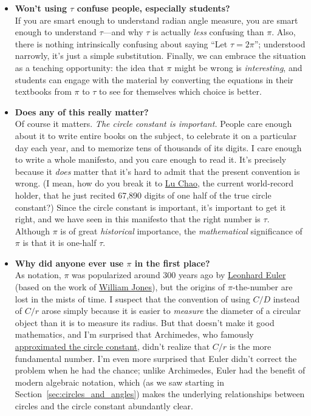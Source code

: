 \begin{itemize}
  \item \textbf{Won't using $\tau$ confuse people, especially students?} \\  If you are smart enough to understand radian angle measure, you are smart enough to understand $\tau$---and  why $\tau$ is actually \emph{less} confusing than $\pi$. Also, there is nothing intrinsically confusing about saying ``Let $\tau = 2\pi$''; understood narrowly, it's just a simple substitution. Finally, we can embrace the situation as a teaching opportunity: the idea that $\pi$ might be wrong is \emph{interesting}, and students can engage with the material by converting the equations in their textbooks from $\pi$ to $\tau$ to see for themselves which choice is better.

  \item \textbf{Does any of this really matter?} \\ Of course it matters. \emph{The circle constant is important.} People care enough about it to write entire books on the subject, to celebrate it on a particular day each year, and to memorize tens of thousands of its digits. I care enough to write a whole manifesto, and you care enough to read it. It's precisely because it \emph{does} matter that it's hard to admit that the present convention is wrong. (I mean, how do you break it to \href{http://en.wikipedia.org/wiki/Lu_Chao}{Lu Chao}, the current world-record holder, that he just recited 67,890 digits of one half of the true circle constant?)
  Since the circle constant is important, it's important to get it right, and we have seen in this manifesto that the right number is $\tau$. Although $\pi$ is of great \emph{historical} importance, the \emph{mathematical} significance of $\pi$ is that it is one-half $\tau$.

  \item \textbf{Why did anyone ever use $\pi$ in the first place?} \\ As notation, $\pi$ was popularized around 300 years ago by \href{http://en.wikipedia.org/wiki/Leonhard_Euler}{Leonhard Euler} (based on the work of \href{http://en.wikipedia.org/wiki/William_Jones_(mathematician)}{William Jones}), but the origins of $\pi$-the-number are lost in the mists of time. I suspect that the convention of using $C/D$ instead of $C/r$ arose simply because it is easier to \emph{measure} the diameter of a circular object than it is to measure its radius. But that doesn't make it good mathematics, and I'm surprised that Archimedes, who famously \href{http://itech.fgcu.edu/faculty/clindsey/mhf4404/archimedes/archimedes.html}{approximated the circle constant}, didn't realize that $C/r$ is the more fundamental number. I'm even more surprised that Euler didn't correct the problem when he had the chance; unlike Archimedes, Euler had the benefit of modern algebraic notation, which (as we saw starting in Section~\ref{sec:circles_and_angles}) makes the underlying relationships between circles and the circle constant abundantly clear.


\end{itemize}
